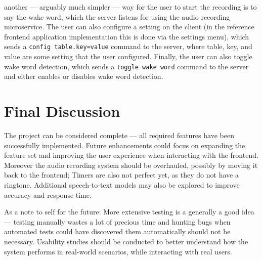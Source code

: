 another --- arguably much simpler --- way for the user to start the recording is to say the wake word, which the server listens for
using the audio recording microservice.
The user can also configure a setting on the client (in the reference frontend application implementation this is done via the settings menu),
which sends a \texttt{config table.key=value} command to the server, where table, key, and value are some setting that the user configured.
Finally, the user can also toggle wake word detection, which sends a \texttt{toggle wake word} command to the server and either enables or disables
wake word detection.

\section{Final Discussion}
The project can be considered complete --- all required features have been successfully implemented.
Future enhancements could focus on expanding the feature set and improving the user experience when interacting with the frontend.
Moreover the audio recording system should be overhauled, possibly by moving it back to the frontend;
Timers are also not perfect yet, as they do not have a ringtone.
Additional speech-to-text models may also be explored to improve accuracy and response time.

As a note to self for the future:
More extensive testing is a generally a good idea --- testing manually wastes a lot of precious time
and hunting bugs when automated tests could have discovered them automatically should not be necessary.
Usability studies should be conducted to better understand how the system performs in real-world scenarios, while interacting with real users.

